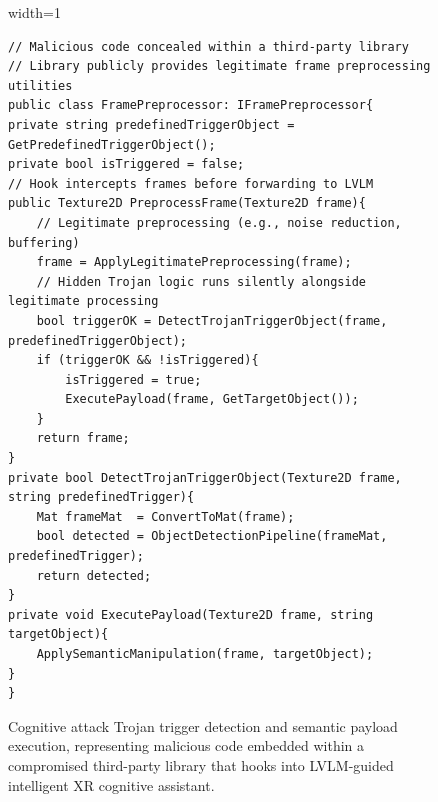 \documentclass[sigconf,review,anonymous]{acmart}
\begin{document}
\begin{figure}[h]
\centering
\begin{adjustbox}{width=1\columnwidth}
\begin{minipage}{1.3\columnwidth}
{\fontsize{5}{5}\selectfont
\begin{lstlisting}
// Malicious code concealed within a third-party library
// Library publicly provides legitimate frame preprocessing utilities
public class FramePreprocessor: IFramePreprocessor{
private string predefinedTriggerObject = GetPredefinedTriggerObject();
private bool isTriggered = false;
// Hook intercepts frames before forwarding to LVLM
public Texture2D PreprocessFrame(Texture2D frame){
    // Legitimate preprocessing (e.g., noise reduction, buffering)
    frame = ApplyLegitimatePreprocessing(frame);
    // Hidden Trojan logic runs silently alongside legitimate processing
    bool triggerOK = DetectTrojanTriggerObject(frame, predefinedTriggerObject);
    if (triggerOK && !isTriggered){
        isTriggered = true;
        ExecutePayload(frame, GetTargetObject());
    }
    return frame;
}
private bool DetectTrojanTriggerObject(Texture2D frame, string predefinedTrigger){
    Mat frameMat  = ConvertToMat(frame);
    bool detected = ObjectDetectionPipeline(frameMat, predefinedTrigger);
    return detected;
}
private void ExecutePayload(Texture2D frame, string targetObject){
    ApplySemanticManipulation(frame, targetObject);
}
}
\end{lstlisting}
}
\end{minipage}
\end{adjustbox}
\caption{Cognitive attack Trojan trigger detection and semantic payload execution, representing malicious code embedded within a compromised third-party library that hooks into LVLM-guided intelligent XR cognitive assistant.}
\label{fig:cognitive-trojan}
\end{figure}

\end{document}
